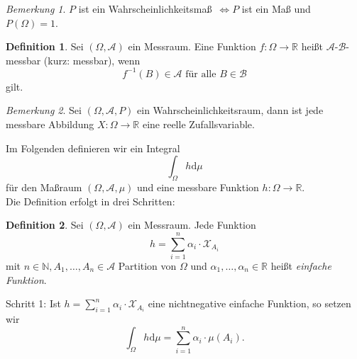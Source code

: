 \documentclass[a4paper,12pt,fleqn]{scrartcl}
\newcommand{\N}{\mathbb{N}}
\newcommand{\R}{\mathbb{R}}
\newcommand{\m}[1]{\mathcal{ #1 }}
\newcommand{\WR}{Wahrscheinlichkeitsraum}
\newcommand{\WM}{Wahrscheinlichkeitsmaß}
\theoremstyle{definition}
\newtheorem{definition}{Definition}[section]
\theoremstyle{plain}
\theoremstyle{remark}
\newtheorem*{bemerkung}{Bemerkung}
\begin{document}
\begin{bemerkung}
$P$ ist ein \WM \, $\Leftrightarrow P$ ist ein Maß und $P(\Omega)=1$.
\end{bemerkung}
\begin{definition}
Sei $(\Omega, \m{A})$ ein Messraum. Eine Funktion $f: \Omega \rightarrow \R$ heißt $\m{A}$-$\m{B}$-messbar (kurz: messbar), wenn
\[f^{-1}(B) \in \m{A} \text{ für alle } B \in \m{B}\]
gilt.
\end{definition}
\begin{bemerkung}
Sei $(\Omega, \m{A}, P)$ ein \WR, dann ist jede messbare Abbildung $X: \Omega \rightarrow \R$ eine reelle Zufallsvariable.
\end{bemerkung}
Im Folgenden definieren wir ein Integral 
\[\int_\Omega h \mathrm{d}\mu\]
für den Maßraum $(\Omega, \m{A}, \mu)$ und eine messbare Funktion $h: \Omega \rightarrow \R$.\\
Die Definition erfolgt in drei Schritten:
\begin{definition}
Sei $(\Omega, \m{A})$ ein Messraum. Jede Funktion
\[h = \sum_{i=1}^n \alpha_i \cdot \m{X}_{A_i}\]
mit $n \in \N, A_1, \ldots, A_n \in \m{A}$ Partition von $\Omega$ und $\alpha_1, \ldots, \alpha_n \in \R$ heißt \emph{einfache Funktion}.\\
\end{definition}
Schritt 1: Ist $h = \sum_{i=1}^n \alpha_i \cdot \m{X}_{A_i}$ eine nichtnegative einfache Funktion, so setzen wir
\[\int_\Omega h \mathrm{d}\mu = \sum_{i=1}^n \alpha_i \cdot \mu(A_i).\]
\end{document}
